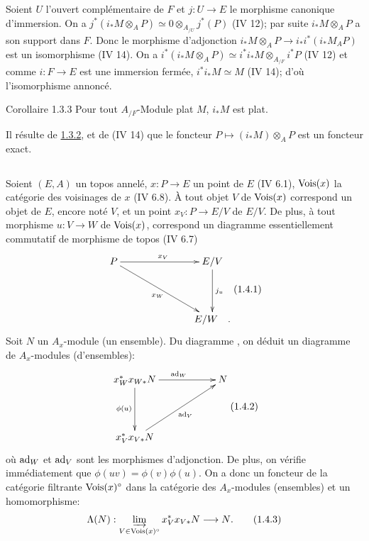 \documentclass[10pt]{../fichiers-configuration-latex/smfart}
\begin{document}
Soient $U$ l'ouvert complémentaire de $F$ et $j : U \to E$ le
morphisme canonique d'immersion. On a $j^{\ast} (i_\ast M \otimes_A P)
\simeq 0 \otimes_{A_{/U}} j^\ast (P)$ (IV 12); par suite $i_{\ast} M
\otimes_{A} P$ a son support dans $F$. Donc le morphisme d'adjonction
$i_{\ast} M \otimes_{A} P \to i_\ast i^\ast (i_\ast M_A P)$ est un
isomorphisme (IV 14). On a $i^{\ast} (i_\ast M \otimes_{A} P) \simeq
i^\ast i_\ast M \otimes_{A_{/F}} i^\ast P$ (IV 12) et comme $i : F \to
E$ est une immersion fermée, $i^{\ast} i_{\ast} M \simeq M$ (IV 14);
d'où l'isomorphisme annoncé.

\begin{enonce*}{Corollaire 1.3.3}
Pour tout $A_{/F}$-Module plat $M$, $i_{\ast} M$ est plat.
\end{enonce*}

Il résulte de \hyperref[V.prop1.3.2]{1.3.2}, et de (IV 14) que le foncteur $P \mapsto
(i_\ast M) \otimes_A P$ est un foncteur exact.

\setcounter{subsection}{3}
\subsection{}
Soient $(E, A)$ un topos annelé, $x : P \to E$ un point de $E$ (IV
6.1), $\operatorname{Vois}(x)$ la catégorie des voisinages de $x$ (IV 6.8). À tout
objet $V$ de $\operatorname{Vois}(x)$ correspond un objet de $E$, encore noté $V$,
et un point $x_V : P \to E/V$ de $E/V$. De plus, à tout morphisme $u
: V \to W$ de $\operatorname{Vois}(x)$, correspond un diagramme essentiellement
commutatif de morphisme de topos (IV 6.7)
\[\vcenter{
\xymatrix@C=2.5cm@R=1.5cm{
P \ar[r]^{x_V} \ar[rd]_{x_W}& E/V \ar[d]^{j_u}\\
& E/W\quad .
}}\leqno{(1.4.1)}
\]
Soit $N$ un $A_x$-module (\resp un ensemble). Du diagramme , on
déduit un diagramme de $A_x$-modules (\resp d'ensembles):
\[\vcenter{
\xymatrix@C=2cm@R=1.5cm{
x^{\ast}_W x_{W\ast}N \ar[r]^{\ad_W} \ar[d]_{\phi(u)}& N\\
x^{\ast}_V x_{V\ast}N \ar[ru]_{\ad_{V}}&
}}\leqno{(1.4.2)}
\]
où \pageoriginale $\operatorname{ad}_W$ et $\operatorname{ad}_V$ sont les morphismes
d'adjonction. De plus, on vérifie immédiatement que $\phi (uv) =
\phi (v) \phi{(u)}$. On a donc un foncteur de la catégorie filtrante
$\operatorname{Vois}(x)^{\circ}$ dans la catégorie des $A_x$-modules
(\resp ensembles) et un homomorphisme:
\begin{equation}
\Lambda (N) : \varinjlim_{V \in \Vois(x)^{\circ}}
x^{\ast}_V x_{V\ast}N \to N {\quoi}.\tag{1.4.3}
\end{equation}
\end{document}
